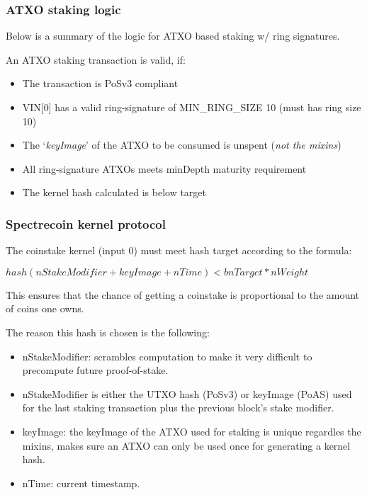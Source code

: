 \subsubsection{ATXO staking logic}
Below is a summary of the logic for ATXO based staking w/ ring signatures.



An ATXO staking transaction is valid, if:
\begin{itemize}
	\item The transaction is PoSv3 compliant
	\item VIN[0] has a valid ring-signature of MIN\_RING\_SIZE 10 (must has ring size 10)
	\item The ‘\textit{keyImage}’ of the ATXO to be consumed is unspent (\textit{not the mixins})
	\item All ring-signature ATXOs meets minDepth maturity requirement
	\item The kernel hash calculated is below target
\end{itemize}



\subsubsection{Spectrecoin kernel protocol}
The coinstake kernel (input 0) must meet hash target according to the formula:



\vspace{5mm} %
$ hash(nStakeModifier + keyImage + nTime) < bnTarget * nWeight  $
\vspace{5mm} %



This ensures that the chance of getting a coinstake is proportional to
the amount of coins one owns.



The reason this hash is chosen is the following:
\begin{itemize}
	\item nStakeModifier: scrambles computation to make it very difficult to precompute future proof-of-stake.
	\item nStakeModifier is either the UTXO hash (PoSv3) or keyImage (PoAS) used for the last staking transaction plus the previous block's stake modifier.
	\item keyImage: the keyImage of the ATXO used for staking is unique regardles the mixins, makes sure an ATXO can only be used once for generating a kernel hash.
	\item nTime: current timestamp.
\end{itemize}



